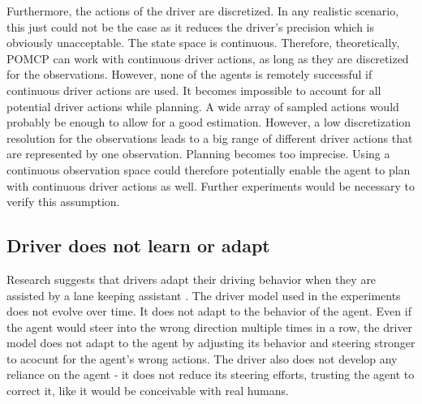 Furthermore, the actions of the driver are discretized. In any realistic scenario, this just could not be the case as it reduces the driver's precision which is obviously unacceptable. The state space is continuous. Therefore, theoretically, POMCP can work with continuous driver actions, as long as they are discretized for the observations. However, none of the agents is remotely successful if continuous driver actions are used. It becomes impossible to account for all potential driver actions while planning. A wide array of sampled actions would probably be enough to allow for a good estimation. However, a low discretization resolution for the observations leads to a big range of different driver actions that are represented by one observation. Planning becomes too imprecise. Using a continuous observation space could therefore potentially enable the agent to plan with continuous driver actions as well. Further experiments would be necessary to verify this assumption.

\subsection{Driver does not learn or adapt}

Research suggests that drivers adapt their driving behavior when they are assisted by a lane keeping assistant \parencite{behavior_adapt}. The driver model used in the experiments does not evolve over time. It does not adapt to the behavior of the agent. Even if the agent would steer into the wrong direction multiple times in a row, the driver model does not adapt to the agent by adjusting its behavior and steering stronger to acocunt for the agent's wrong actions. The driver also does not develop any reliance on the agent - it does not reduce its steering efforts, trusting the agent to correct it, like it would be conceivable with real humans.


